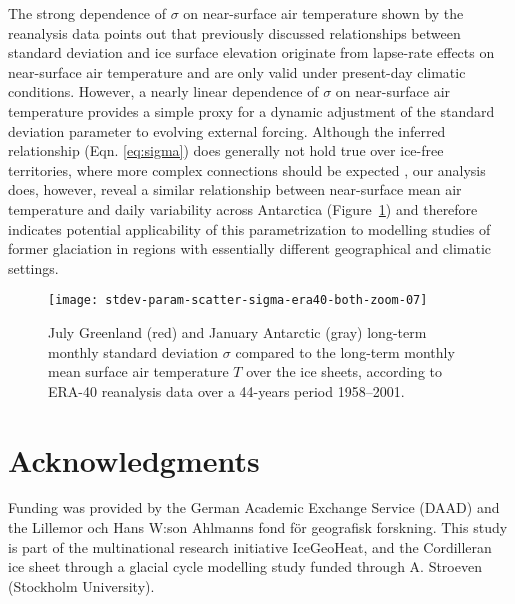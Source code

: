 \documentclass[review]{igs}
\begin{document}
The strong dependence of $\sigma$ on near-surface air temperature shown by the reanalysis data points out that previously discussed relationships between standard deviation and ice surface elevation \citep{fausto-etal-2009,fausto-etal-2011} originate from lapse-rate effects on near-surface air temperature and are only valid under present-day climatic conditions. However, a nearly linear dependence of $\sigma$ on near-surface air temperature provides a simple proxy for a dynamic adjustment of the standard deviation parameter to evolving external forcing. Although the inferred relationship (Eqn. \ref{eq:sigma}) does generally not hold true over ice-free territories, where more complex connections should be expected \citep{seguinot-2013}, our analysis does, however, reveal a similar relationship between near-surface mean air temperature and daily variability across Antarctica (Figure~\ref{fig:both}) and therefore indicates potential applicability of this parametrization to modelling studies of former glaciation in regions with essentially different geographical and climatic settings.

\begin{figure}
    \centering\texttt{[image: stdev-param-scatter-sigma-era40-both-zoom-07]}
    \caption{July Greenland (red) and January Antarctic (gray) long-term monthly standard deviation $\sigma$ compared to the long-term monthly mean surface air temperature $T$ over the ice sheets, according to ERA-40 reanalysis data \citep{uppala-etal-2005} over a 44-years period 1958–2001.}
    \label{fig:both}
\end{figure}


\section{Acknowledgments}

Funding was provided by the German Academic Exchange Service (DAAD) and the Lillemor och Hans W:son Ahlmanns fond för geografisk forskning. This study is part of the multinational research initiative IceGeoHeat, and the Cordilleran ice sheet through a glacial cycle modelling study funded through A. Stroeven (Stockholm University).



\end{document}
